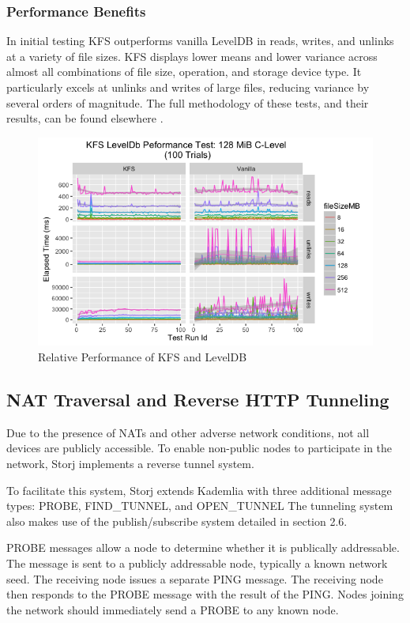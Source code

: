\documentclass[a4paper,10pt]{article}
\begin{document}
\subsubsection{Performance Benefits}
In initial testing KFS outperforms vanilla LevelDB in reads, writes, and unlinks at a variety of file sizes. KFS displays lower means and lower variance across almost all combinations of file size, operation, and storage device type. It particularly excels at unlinks and writes of large files, reducing variance by several orders of magnitude. The full methodology of these tests, and their results, can be found elsewhere \cite{13}.

\begin{figure}[hbt]
\centering
\includegraphics[width=\linewidth]{6}
\caption{Relative Performance of KFS and LevelDB}
\end{figure}

\subsection{NAT Traversal and Reverse HTTP Tunneling}
Due to the presence of NATs and other adverse network conditions, not all devices are publicly accessible. To enable non-public nodes to participate in the network, Storj implements a reverse tunnel system.

To facilitate this system, Storj extends Kademlia with three additional message types: PROBE, FIND\_TUNNEL, and OPEN\_TUNNEL The tunneling system also makes use of the publish/subscribe system detailed in section 2.6.

PROBE messages allow a node to determine whether it is publically addressable. The message is sent to a publicly addressable node, typically a known network seed. The receiving node issues a separate PING message. The receiving node then responds to the PROBE message with the result of the PING. Nodes joining the network should immediately send a PROBE to any known node.
\end{document}
